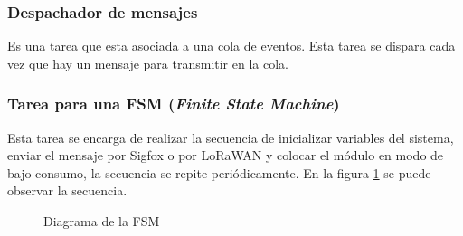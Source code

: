 \subsubsection{Despachador de mensajes}
Es una tarea que esta asociada a una cola de eventos. Esta tarea se dispara cada vez que hay un mensaje para transmitir en la cola.
\\
\newline
\newline
\newline
\newline
\hfill \break
\subsubsection{Tarea para una FSM (\textit{Finite State Machine})}
Esta tarea se encarga de realizar la secuencia de inicializar variables del sistema, enviar el mensaje por Sigfox o por LoRaWAN y colocar el módulo en modo de bajo consumo, la secuencia se repite periódicamente. En la figura \ref{fig:DiagramadeFSM} se puede observar la secuencia.

\begin{figure}[H]
\centering
{}
\caption{Diagrama de la FSM}
\label{fig:DiagramadeFSM}
\end{figure}

